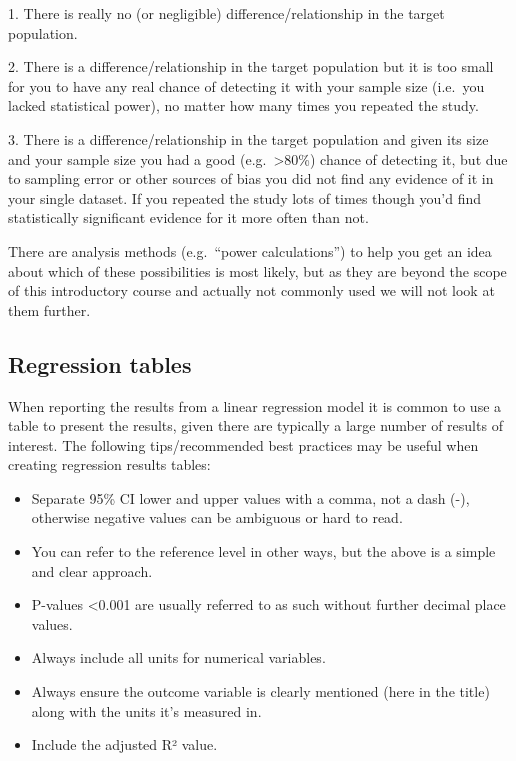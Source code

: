 \documentclass[
]{book}
\begin{document}
1. There is really no (or negligible) difference/relationship in the target population.

2. There is a difference/relationship in the target population but it is too small for you to have any real chance of detecting it with your sample size (i.e.~you lacked statistical power), no matter how many times you repeated the study.

3. There is a difference/relationship in the target population and given its size and your sample size you had a good (e.g.~\textgreater80\%) chance of detecting it, but due to sampling error or other sources of bias you did not find any evidence of it in your single dataset. If you repeated the study lots of times though you'd find statistically significant evidence for it more often than not.

There are analysis methods (e.g.~``power calculations'') to help you get an idea about which of these possibilities is most likely, but as they are beyond the scope of this introductory course and actually not commonly used we will not look at them further.

\hypertarget{regression-tables}{%
\subsection{Regression tables}\label{regression-tables}}

When reporting the results from a linear regression model it is common to use a table to present the results, given there are typically a large number of results of interest. The following tips/recommended best practices may be useful when creating regression results tables:

\begin{itemize}
\item
  Separate 95\% CI lower and upper values with a comma, not a dash (-), otherwise negative values can be ambiguous or hard to read.
\item
  You can refer to the reference level in other ways, but the above is a simple and clear approach.
\item
  P-values \textless0.001 are usually referred to as such without further decimal place values.
\item
  Always include all units for numerical variables.
\item
  Always ensure the outcome variable is clearly mentioned (here in the title) along with the units it's measured in.
\item
  Include the adjusted R² value.
\end{itemize}
\end{document}
